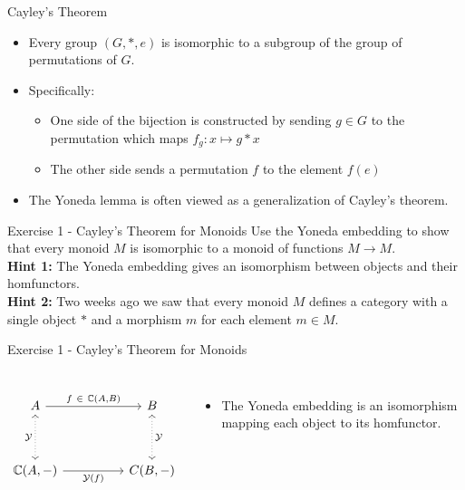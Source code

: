 \begin{frame}{Cayley's Theorem}
\begin{itemize}
	\item Every group $(G, *, e)$ is isomorphic to a subgroup of the group of permutations of $G$.
	\pause\item Specifically:
	\begin{itemize}
		\item One side of the bijection is constructed by sending $g \in G$ to the permutation which maps $f_g : x \mapsto g * x$
		\item The other side sends a permutation $f$ to the element $f(e)$
	\end{itemize}
	\pause\item The Yoneda lemma is often viewed as a generalization of Cayley's theorem.
\end{itemize}
\end{frame}
\begin{frame}{Exercise 1 - Cayley's Theorem for Monoids}
	Use the Yoneda embedding to show that every monoid $M$ is isomorphic to a monoid of functions $M \to M$. 
	\\
	\textbf{Hint 1:} The Yoneda embedding gives an isomorphism between objects and their homfunctors. \\
	\textbf{Hint 2:} Two weeks ago we saw that every monoid $M$ defines a category with a single object $*$ and a morphism $m$ for each element $m \in M$. 
\end{frame}
\begin{frame}[fragile]{Exercise 1 - Cayley's Theorem for Monoids}
	\begin{columns}
		\[\begin{tikzcd}
			A && B \\
			\\
			{\mathbb{C}(A, -)} && {C(B,-)}
			\arrow["{f\ \in\ \mathbb{C}(A,B)}", from=1-1, to=1-3]
			\arrow["{\mathcal{Y}}"', dotted, leftrightarrow, from=1-1, to=3-1]
			\arrow["{\mathcal{Y}}", dotted, leftrightarrow, from=1-3, to=3-3]
			\arrow["{\mathcal{Y}(f)}"', from=3-1, to=3-3]
		\end{tikzcd}\]
		\begin{itemize}
			\item The Yoneda embedding is an isomorphism mapping each object to its homfunctor.
		\end{itemize}
	\end{columns}
\end{frame}
